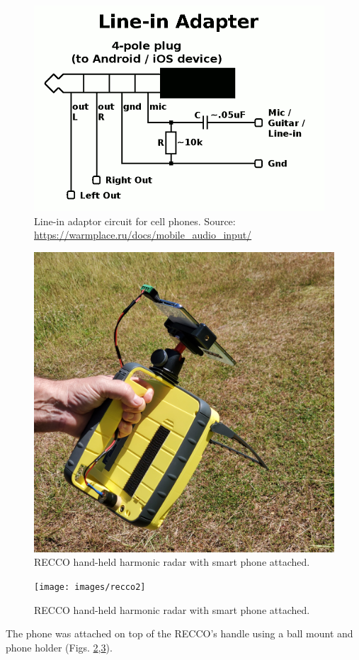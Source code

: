 \documentclass[12pt,letterpaper,english,bibliography=totocnumbered, abstract=on]{scrartcl}
\begin{document}
\begin{figure}[p]
	\centering
	\includegraphics[width=0.7\linewidth]{images/adapter}
	\caption{Line-in adaptor circuit for cell phones. Source: \url{https://warmplace.ru/docs/mobile_audio_input/}}
	\label{fig:adapter}
\end{figure}

\begin{figure}[p]
	\centering
	\includegraphics[width=0.7\linewidth,angle=-90]{images/recco1}
	\caption{RECCO hand-held harmonic radar with smart phone attached.}
	\label{fig:recco1}
\end{figure}

\begin{figure}[p]
	\centering
	\texttt{[image: images/recco2]}
	\caption{RECCO hand-held harmonic radar with smart phone attached.}
	\label{fig:recco2}
\end{figure}


The phone was attached on top of the RECCO's handle using a ball mount and phone holder (Figs. \ref{fig:recco1},\ref{fig:recco2}).
\end{document}
